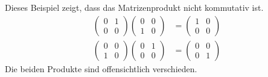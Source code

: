 \begin{beispiel}
Dieses Beispiel zeigt, dass das Matrizenprodukt nicht kommutativ ist.
\begin{align*}
\begin{pmatrix} 0&1\\0&0 \end{pmatrix}
\begin{pmatrix} 0&0\\1&0 \end{pmatrix}
&=
\begin{pmatrix} 1&0\\0&0 \end{pmatrix}
\\
\begin{pmatrix} 0&0\\1&0 \end{pmatrix}
\begin{pmatrix} 0&1\\0&0 \end{pmatrix}
&=
\begin{pmatrix} 0&0\\0&1 \end{pmatrix}
\end{align*}
Die beiden Produkte sind offensichtlich verschieden.
\end{beispiel}

